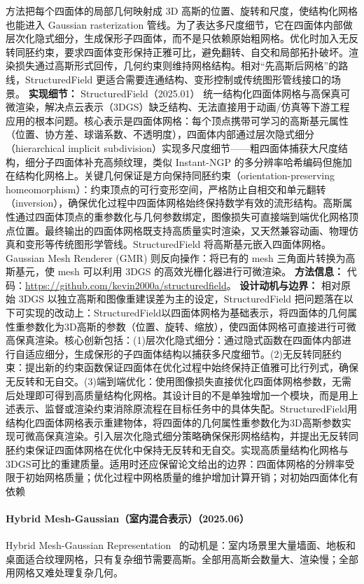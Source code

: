 方法把每个四面体的局部几何映射成 3D 高斯的位置、旋转和尺度，使结构化网格也能进入 Gaussian rasterization 管线。为了表达多尺度细节，它在四面体内部做层次化隐式细分，生成保形子四面体，而不是只依赖原始粗网格。优化时加入无反转同胚约束，要求四面体变形保持正雅可比，避免翻转、自交和局部拓扑破坏。渲染损失通过高斯形式回传，几何约束则维持网格结构。相对“先高斯后网格”的路线，StructuredField 更适合需要连通结构、变形控制或传统图形管线接口的场景。
\textbf{实现细节：} StructuredField（2025.01） 统一结构化四面体网格与高保真可微渲染，解决点云表示（3DGS）缺乏结构、无法直接用于动画/仿真等下游工程应用的根本问题。核心表示是四面体网格：每个顶点携带可学习的高斯基元属性（位置、协方差、球谐系数、不透明度），四面体内部通过层次隐式细分（hierarchical implicit subdivision）实现多尺度细节——粗四面体捕获大尺度结构，细分子四面体补充高频纹理，类似 Instant-NGP 的多分辨率哈希编码但施加在结构化网格上。关键几何保证是方向保持同胚约束（orientation-preserving homeomorphism）：约束顶点的可行变形空间，严格防止自相交和单元翻转（inversion），确保优化过程中四面体网格始终保持数学有效的流形结构。高斯属性通过四面体顶点的重参数化与几何参数绑定，图像损失可直接端到端优化网格顶点位置。最终输出的四面体网格既支持高质量实时渲染，又天然兼容动画、物理仿真和变形等传统图形学管线。StructuredField 将高斯基元嵌入四面体网格。Gaussian Mesh Renderer (GMR) 则反向操作：将已有的 mesh 三角面片转换为高斯基元，使 mesh 可以利用 3DGS 的高效光栅化器进行可微渲染。
\textbf{方法信息：} 代码：\url{https://github.com/kevin2000a/structuredfield}。
\textbf{设计动机与边界：} 相对原始 3DGS 以独立高斯和图像重建误差为主的设定，StructuredField 把问题落在以下可实现的改动上：StructuredField以四面体网格为基础表示，将四面体的几何属性重参数化为3D高斯的参数（位置、旋转、缩放），使四面体网格可直接进行可微高保真渲染。核心创新包括：(1)层次化隐式细分：通过隐式函数在四面体内部进行自适应细分，生成保形的子四面体结构以捕获多尺度细节。(2)无反转同胚约束：提出新的约束函数保证四面体在优化过程中始终保持正值雅可比行列式，确保无反转和无自交。(3)端到端优化：使用图像损失直接优化四面体网格参数，无需后处理即可得到高质量结构化网格。其设计目的不是单独增加一个模块，而是用上述表示、监督或渲染约束消除原流程在目标任务中的具体失配。StructuredField用结构化四面体网格表示重建物体，将四面体的几何属性重参数化为3D高斯参数实现可微高保真渲染。引入层次化隐式细分策略确保保形网格结构，并提出无反转同胚约束保证四面体网格在优化中保持无反转和无自交。实现高质量结构化网格与3DGS可比的重建质量。适用时还应保留论文给出的边界：四面体网格的分辨率受限于初始网格质量；优化过程中网格质量的维护增加计算开销；对初始四面体化有依赖
\paragraph{Hybrid Mesh-Gaussian（室内混合表示）（2025.06）}
Hybrid Mesh-Gaussian Representation~\cite{2506_06988} 的动机是：室内场景里大量墙面、地板和桌面适合纹理网格，只有复杂细节需要高斯。全部用高斯会数量大、渲染慢；全部用网格又难处理复杂几何。

